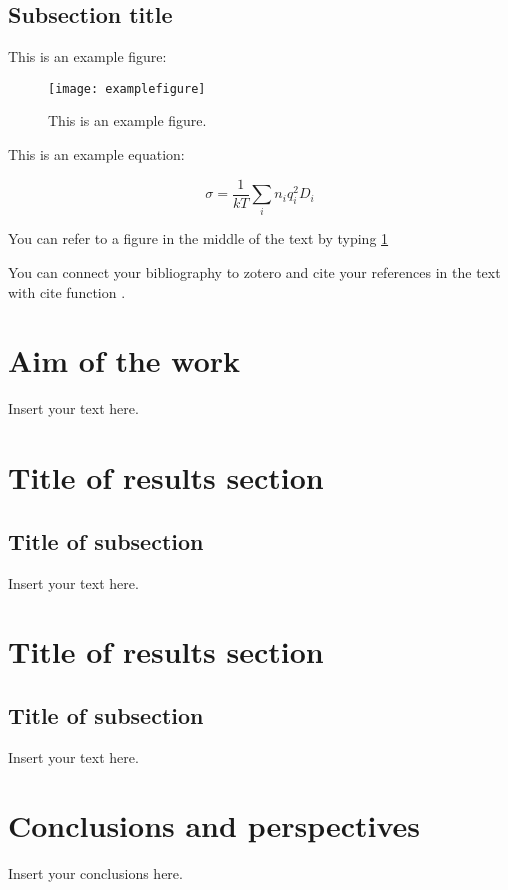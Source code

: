 \subsection{Subsection title}


This is an example figure:

 \begin{figure}[h!]
	\centering
	\texttt{[image: examplefigure]}
	\caption{This is an example figure.}
	\label{figurelabel}	 
\end{figure}

This is an example equation:

\begin{equation}
	\sigma = \frac{1}{kT} \sum_i n_i q_i^2 D_i
\end{equation}

You can refer to a figure in the middle of the text by typing \ref{figurelabel}

You can connect your bibliography to zotero and cite your references in the text with cite function \cite{referencename}. 

\section{Aim of the work}

 Insert your text here.

\section{Title of results section}
 \subsection{Title of subsection}
 
 Insert your text here.
 
 \section{Title of results section}
 \subsection{Title of subsection}

 Insert your text here.


\clearpage
\section{Conclusions and perspectives}

Insert your conclusions here. 

\printbibliography[heading=bibliography, title={References}]


